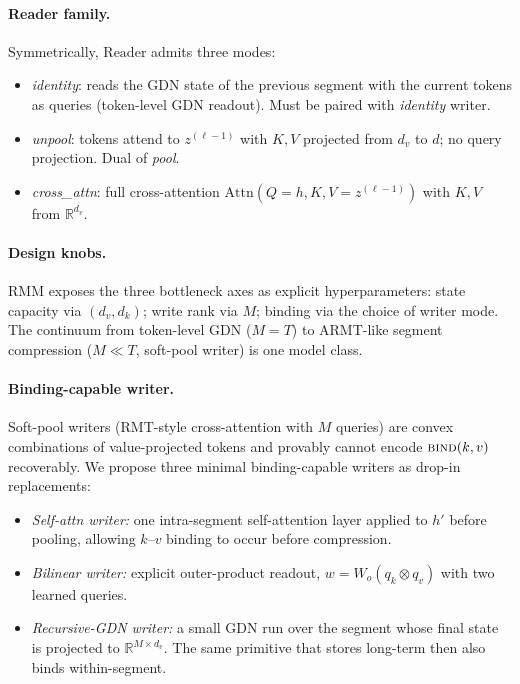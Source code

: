 \documentclass[11pt]{article}
\begin{document}
\paragraph{Reader family.} Symmetrically, $\mathrm{Reader}$ admits three modes:
\begin{itemize}
    \item \emph{identity}: reads the GDN state of the previous segment with the current tokens as queries (token-level GDN readout). Must be paired with \emph{identity} writer.
    \item \emph{unpool}: tokens attend to $z^{(\ell-1)}$ with $K, V$ projected from $d_v$ to $d$; no query projection. Dual of \emph{pool}.
    \item \emph{cross\_attn}: full cross-attention $\mathrm{Attn}(Q{=}h, K, V{=}z^{(\ell-1)})$ with $K, V$ from $\mathbb{R}^{d_v}$.
\end{itemize}

\paragraph{Design knobs.} RMM exposes the three bottleneck axes as explicit hyperparameters: state capacity via $(d_v, d_k)$; write rank via $M$; binding via the choice of writer mode. The continuum from token-level GDN ($M{=}T$) to ARMT-like segment compression ($M{\ll}T$, soft-pool writer) is one model class.

\paragraph{Binding-capable writer.} Soft-pool writers (RMT-style cross-attention with $M$ queries) are convex combinations of value-projected tokens and provably cannot encode $\textsc{bind}(k, v)$ recoverably. We propose three minimal binding-capable writers as drop-in replacements:
\begin{itemize}
    \item \emph{Self-attn writer:} one intra-segment self-attention layer applied to $h'$ before pooling, allowing $k$--$v$ binding to occur before compression.
    \item \emph{Bilinear writer:} explicit outer-product readout, $w = W_o(q_k \otimes q_v)$ with two learned queries.
    \item \emph{Recursive-GDN writer:} a small GDN run over the segment whose final state is projected to $\mathbb{R}^{M \times d_v}$. The same primitive that stores long-term then also binds within-segment.
\end{itemize}
\end{document}
